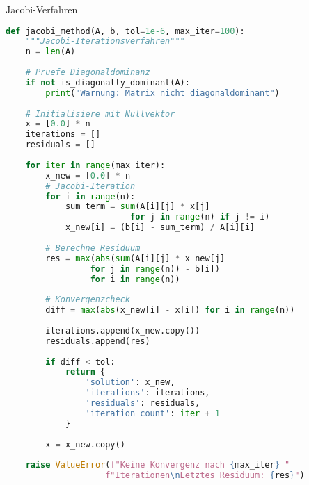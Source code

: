 \begin{examplecode}{Jacobi-Verfahren}
\begin{lstlisting}[language=Python, style=basesmol]
def jacobi_method(A, b, tol=1e-6, max_iter=100):
    """Jacobi-Iterationsverfahren"""
    n = len(A)
    
    # Pruefe Diagonaldominanz
    if not is_diagonally_dominant(A):
        print("Warnung: Matrix nicht diagonaldominant")
    
    # Initialisiere mit Nullvektor
    x = [0.0] * n
    iterations = []
    residuals = []
    
    for iter in range(max_iter):
        x_new = [0.0] * n
        # Jacobi-Iteration
        for i in range(n):
            sum_term = sum(A[i][j] * x[j] 
                         for j in range(n) if j != i)
            x_new[i] = (b[i] - sum_term) / A[i][i]
            
        # Berechne Residuum
        res = max(abs(sum(A[i][j] * x_new[j] 
                 for j in range(n)) - b[i]) 
                 for i in range(n))
                 
        # Konvergenzcheck
        diff = max(abs(x_new[i] - x[i]) for i in range(n))
        
        iterations.append(x_new.copy())
        residuals.append(res)
        
        if diff < tol:
            return {
                'solution': x_new,
                'iterations': iterations,
                'residuals': residuals,
                'iteration_count': iter + 1
            }
            
        x = x_new.copy()
        
    raise ValueError(f"Keine Konvergenz nach {max_iter} "
                    f"Iterationen\nLetztes Residuum: {res}")
\end{lstlisting}
\end{examplecode}

